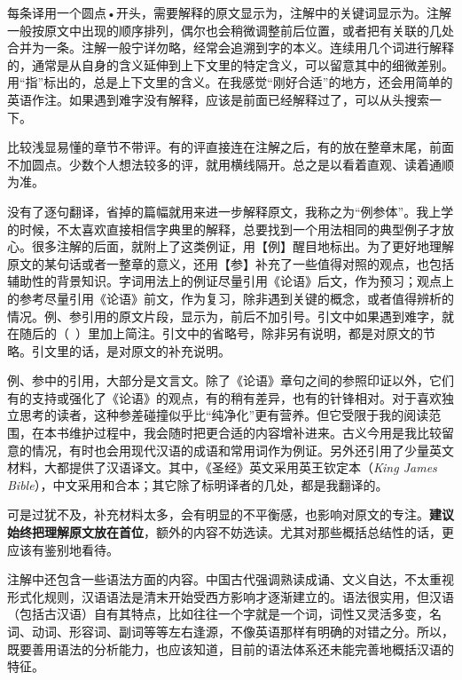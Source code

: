 每条译用一个圆点•开头，需要解释的原文显示为，注解中的关键词显示为。注解一般按原文中出现的顺序排列，偶尔也会稍微调整前后位置，或者把有关联的几处合并为一条。注解一般宁详勿略，经常会追溯到字的本义。连续用几个词进行解释的，通常是从自身的含义延伸到上下文里的特定含义，可以留意其中的细微差别。用“指”标出的，总是上下文里的含义。在我感觉“刚好合适”的地方，还会用简单的英语作注。如果遇到难字没有解释，应该是前面已经解释过了，可以从头搜索一下。

比较浅显易懂的章节不带评。有的评直接连在注解之后，有的放在整章末尾，前面不加圆点。少数个人想法较多的评，就用横线隔开。总之是以看着直观、读着通顺为准。

没有了逐句翻译，省掉的篇幅就用来进一步解释原文，我称之为“例参体”。我上学的时候，不太喜欢直接相信字典里的解释，总要找到一个用法相同的典型例子才放心。很多注解的后面，就附上了这类例证，用【例】醒目地标出。为了更好地理解原文的某句话或者一整章的意义，还用【参】补充了一些值得对照的观点，也包括辅助性的背景知识。字词用法上的例证尽量引用《论语》后文，作为预习；观点上的参考尽量引用《论语》前文，作为复习，除非遇到关键的概念，或者值得辨析的情况。例、参引用的原文片段，显示为，前后不加引号。引文中如果遇到难字，就在随后的（~）里加上简注。引文中的省略号，除非另有说明，都是对原文的节略。引文里的话，是对原文的补充说明。

例、参中的引用，大部分是文言文。除了《论语》章句之间的参照印证以外，它们有的支持或强化了《论语》的观点，有的稍有差异，也有的针锋相对。对于喜欢独立思考的读者，这种参差碰撞似乎比“纯净化”更有营养。但它受限于我的阅读范围，在本书维护过程中，我会随时把更合适的内容增补进来。古义今用是我比较留意的情况，有时也会用现代汉语的成语和常用词作为例证。另外还引用了少量英文材料，大都提供了汉语译文。其中，《圣经》英文采用英王钦定本（\emph{King James Bible}），中文采用和合本；其它除了标明译者的几处，都是我翻译的。

可是过犹不及，补充材料太多，会有明显的不平衡感，也影响对原文的专注。\textbf{建议始终把理解原文放在首位}，额外的内容不妨选读。尤其对那些概括总结性的话，更应该有鉴别地看待。

注解中还包含一些语法方面的内容。中国古代强调熟读成诵、文义自达，不太重视形式化规则，汉语语法是清末开始受西方影响才逐渐建立的。语法很实用，但汉语（包括古汉语）自有其特点，比如往往一个字就是一个词，词性又灵活多变，名词、动词、形容词、副词等等左右逢源，不像英语那样有明确的对错之分。所以，既要善用语法的分析能力，也应该知道，目前的语法体系还未能完善地概括汉语的特征。

